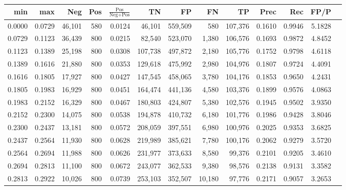 \begin{tabular}{rrrrrrrrrrrrr}
\toprule
   min &    max &    Neg &   Pos & $\frac{\text{Pos}}{\text{Neg}+\text{Pos}}$ &      TN &      FP &      FN &      TP &   Prec &    Rec &   FP/P \\
\midrule
0.0000 & 0.0729 & 46,101 &   580 &                                     0.0124 &  46,101 & 559,509 &     580 & 107,376 & 0.1610 & 0.9946 & 5.1828 \\
0.0729 & 0.1123 & 36,439 &   800 &                                     0.0215 &  82,540 & 523,070 &   1,380 & 106,576 & 0.1693 & 0.9872 & 4.8452 \\
0.1123 & 0.1389 & 25,198 &   800 &                                     0.0308 & 107,738 & 497,872 &   2,180 & 105,776 & 0.1752 & 0.9798 & 4.6118 \\
0.1389 & 0.1616 & 21,880 &   800 &                                     0.0353 & 129,618 & 475,992 &   2,980 & 104,976 & 0.1807 & 0.9724 & 4.4091 \\
0.1616 & 0.1805 & 17,927 &   800 &                                     0.0427 & 147,545 & 458,065 &   3,780 & 104,176 & 0.1853 & 0.9650 & 4.2431 \\
0.1805 & 0.1983 & 16,929 &   800 &                                     0.0451 & 164,474 & 441,136 &   4,580 & 103,376 & 0.1899 & 0.9576 & 4.0863 \\
0.1983 & 0.2152 & 16,329 &   800 &                                     0.0467 & 180,803 & 424,807 &   5,380 & 102,576 & 0.1945 & 0.9502 & 3.9350 \\
0.2152 & 0.2300 & 14,075 &   800 &                                     0.0538 & 194,878 & 410,732 &   6,180 & 101,776 & 0.1986 & 0.9428 & 3.8046 \\
0.2300 & 0.2437 & 13,181 &   800 &                                     0.0572 & 208,059 & 397,551 &   6,980 & 100,976 & 0.2025 & 0.9353 & 3.6825 \\
0.2437 & 0.2564 & 11,930 &   800 &                                     0.0628 & 219,989 & 385,621 &   7,780 & 100,176 & 0.2062 & 0.9279 & 3.5720 \\
0.2564 & 0.2694 & 11,988 &   800 &                                     0.0626 & 231,977 & 373,633 &   8,580 &  99,376 & 0.2101 & 0.9205 & 3.4610 \\
0.2694 & 0.2813 & 11,100 &   800 &                                     0.0672 & 243,077 & 362,533 &   9,380 &  98,576 & 0.2138 & 0.9131 & 3.3582 \\
0.2813 & 0.2922 & 10,026 &   800 &                                     0.0739 & 253,103 & 352,507 &  10,180 &  97,776 & 0.2171 & 0.9057 & 3.2653 \\

\end{tabular}
